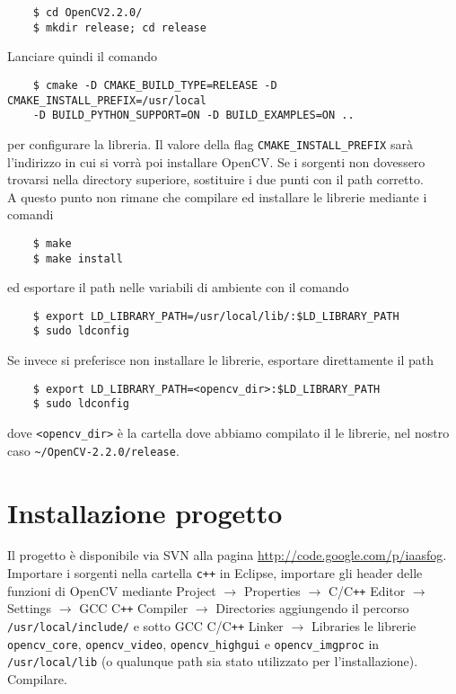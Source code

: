 \documentclass[12pt]{report}
\begin{document}
\begin{verbatim}
	$ cd OpenCV2.2.0/
	$ mkdir release; cd release
\end{verbatim}

\noindent Lanciare quindi il comando

\begin{verbatim}
	$ cmake -D CMAKE_BUILD_TYPE=RELEASE -D CMAKE_INSTALL_PREFIX=/usr/local
	-D BUILD_PYTHON_SUPPORT=ON -D BUILD_EXAMPLES=ON ..
\end{verbatim}

\noindent per configurare la libreria. Il valore della flag \verb|CMAKE_INSTALL_PREFIX| sar\`a l'indirizzo in cui si vorr\`a poi installare OpenCV. Se i sorgenti non dovessero trovarsi nella directory superiore, sostituire i due punti con il path corretto.\\

\noindent A questo punto non rimane che compilare ed installare le librerie mediante i comandi

\begin{verbatim}
	$ make
	$ make install
\end{verbatim}

\noindent ed esportare il path nelle variabili di ambiente con il comando

\begin{verbatim}
	$ export LD_LIBRARY_PATH=/usr/local/lib/:$LD_LIBRARY_PATH
	$ sudo ldconfig
\end{verbatim}

\noindent Se invece si preferisce non installare le librerie, esportare direttamente il path 

\begin{verbatim}
	$ export LD_LIBRARY_PATH=<opencv_dir>:$LD_LIBRARY_PATH
	$ sudo ldconfig
\end{verbatim}

\noindent dove \verb|<opencv_dir>| \`e la cartella dove abbiamo compilato il le librerie, nel nostro caso \verb|~/OpenCV-2.2.0/release|.

\section{Installazione progetto}
\noindent Il progetto \`e disponibile via SVN alla pagina \url{http://code.google.com/p/iaasfog}.\\
Importare i sorgenti nella cartella \verb|c++| in Eclipse, importare gli header delle funzioni di OpenCV mediante Project $\rightarrow$ Properties  $\rightarrow$ C\slash C\verb|++| Editor $\rightarrow$ Settings $\rightarrow$ GCC C\verb|++| Compiler $\rightarrow$ Directories aggiungendo il percorso \verb|/usr/local/include/| e sotto GCC C\slash C\verb|++| Linker $\rightarrow$ Libraries le librerie \verb|opencv_core|, \verb|opencv_video|, \verb|opencv_highgui| e \verb|opencv_imgproc| in \verb|/usr/local/lib| (o qualunque path sia stato utilizzato per l'installazione).\\
Compilare.\\
\end{document}
